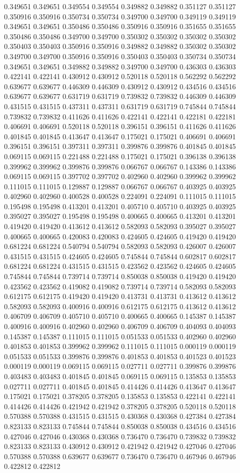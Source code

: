 0.349651 0.349651 0.349554 0.349554 0.349882 0.349882 0.351127 0.351127 0.350916 0.350916 0.350734 0.350734 0.349700 0.349700 0.349119 0.349119 0.349651 0.349651 0.350486 0.350486 0.350916 0.350916 0.351655 0.351655 0.350486 0.350486 0.349700 0.349700 0.350302 0.350302 0.350302 0.350302 0.350403 0.350403 0.350916 0.350916 0.349882 0.349882 0.350302 0.350302 0.349700 0.349700 0.350916 0.350916 0.350403 0.350403 0.350734 0.350734 0.349651 0.349651 0.349882 0.349882 0.349700 0.349700 0.436303 0.436303 0.422141 0.422141 0.430912 0.430912 0.520118 0.520118 0.562292 0.562292 0.639677 0.639677 0.446309 0.446309 0.430912 0.430912 0.434516 0.434516 0.639677 0.639677 0.631719 0.631719 0.739832 0.739832 0.446309 0.446309 0.431515 0.431515 0.437311 0.437311 0.631719 0.631719 0.745844 0.745844 0.739832 0.739832 0.411626 0.411626 0.422141 0.422141 0.422181 0.422181 0.406691 0.406691 0.520118 0.520118 0.396151 0.396151 0.411626 0.411626 0.401845 0.401845 0.413647 0.413647 0.175021 0.175021 0.406691 0.406691 0.396151 0.396151 0.397311 0.397311 0.399876 0.399876 0.401845 0.401845 0.069115 0.069115 0.221488 0.221488 0.175021 0.175021 0.396138 0.396138 0.399962 0.399962 0.399876 0.399876 0.066767 0.066767 0.143386 0.143386 0.069115 0.069115 0.397702 0.397702 0.402960 0.402960 0.399962 0.399962 0.111015 0.111015 0.129887 0.129887 0.066767 0.066767 0.403925 0.403925 0.402960 0.402960 0.400528 0.400528 0.224091 0.224091 0.111015 0.111015 0.195498 0.195498 0.413201 0.413201 0.405710 0.405710 0.403925 0.403925 0.395027 0.395027 0.195498 0.195498 0.400665 0.400665 0.413201 0.413201 0.419420 0.419420 0.413612 0.413612 0.582093 0.582093 0.395027 0.395027 0.400665 0.400665 0.420083 0.420083 0.424605 0.424605 0.419420 0.419420 0.681224 0.681224 0.540794 0.540794 0.582093 0.582093 0.426007 0.426007 0.431515 0.431515 0.424605 0.424605 0.745844 0.745844 0.602817 0.602817 0.681224 0.681224 0.431515 0.431515 0.423562 0.423562 0.424605 0.424605 0.745844 0.745844 0.739714 0.739714 0.850038 0.850038 0.419420 0.419420 0.423562 0.423562 0.419082 0.419082 0.739714 0.739714 0.582093 0.582093 0.612175 0.612175 0.419420 0.419420 0.413731 0.413731 0.413612 0.413612 0.582093 0.582093 0.400916 0.400916 0.612175 0.612175 0.413612 0.413612 0.406709 0.406709 0.405710 0.405710 0.400665 0.400665 0.145387 0.145387 0.400916 0.400916 0.402960 0.402960 0.406709 0.406709 0.404093 0.404093 0.145387 0.145387 0.111015 0.111015 0.051533 0.051533 0.402960 0.402960 0.401853 0.401853 0.399962 0.399962 0.111015 0.111015 0.000119 0.000119 0.051533 0.051533 0.399876 0.399876 0.401853 0.401853 0.401523 0.401523 0.000119 0.000119 0.069115 0.069115 0.027711 0.027711 0.399876 0.399876 0.403483 0.403483 0.401845 0.401845 0.069115 0.069115 0.135853 0.135853 0.027711 0.027711 0.401845 0.401845 0.414426 0.414426 0.413647 0.413647 0.175021 0.175021 0.378205 0.378205 0.135853 0.135853 0.422141 0.422141 0.414426 0.414426 0.421942 0.421942 0.378205 0.378205 0.520118 0.520118 0.570388 0.570388 0.431515 0.431515 0.430368 0.430368 0.427384 0.427384 0.823133 0.823133 0.745844 0.745844 0.850038 0.850038 0.434516 0.434516 0.427046 0.427046 0.430368 0.430368 0.736470 0.736470 0.739832 0.739832 0.823133 0.823133 0.430912 0.430912 0.421942 0.421942 0.427046 0.427046 0.570388 0.570388 0.639677 0.639677 0.736470 0.736470 0.467946 0.467946 0.422812 0.422812 